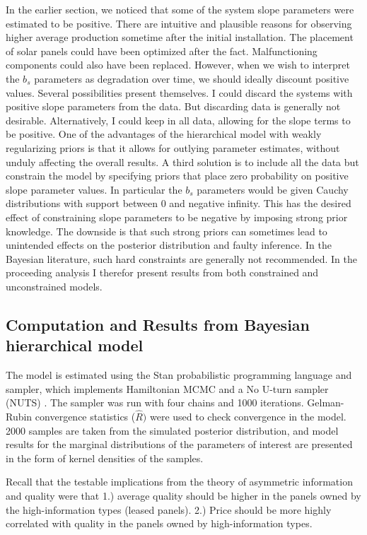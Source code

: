 \documentclass[a4paper]{article}
\begin{document}
In the earlier section, we noticed that some of the system slope parameters were estimated to be positive. There are intuitive and plausible reasons for observing higher average production sometime after the initial installation. The placement of solar panels could have been optimized after the fact. Malfunctioning components could also have been replaced. However, when we wish to interpret the $b_s$ parameters as degradation over time, we should ideally discount positive values. Several possibilities present themselves. I could discard the systems with positive slope parameters from the data. But discarding data is generally not desirable. Alternatively, I could keep in all data, allowing for the slope terms to be positive. One of the advantages of the hierarchical model with weakly regularizing priors is that it allows for outlying parameter estimates, without unduly affecting the overall results. A third solution is to include all the data but constrain the model by specifying priors that place zero probability on positive slope parameter values. In particular the $b_s$ parameters would be given Cauchy distributions with support between 0 and negative infinity. This has the desired effect of constraining slope parameters to be negative by imposing strong prior knowledge. The downside is that such strong priors can sometimes lead to unintended effects on the posterior distribution and faulty inference. In the Bayesian literature, such hard constraints are generally not recommended. In the proceeding analysis I therefor present results from both constrained and unconstrained models.

\subsection{Computation and Results from Bayesian hierarchical model}

The model is estimated using the Stan probabilistic programming language and sampler, which implements Hamiltonian MCMC and a No U-turn sampler (NUTS) \citep{stan_development_team_stan_2014}. The sampler was run with four chains and 1000 iterations. Gelman-Rubin convergence statistics ($\hat{R})$ were used to check convergence in the model. 2000 samples are taken from the simulated posterior distribution, and model results for the marginal distributions of the parameters of interest are presented in the form of kernel densities of the samples.

Recall that the testable implications from the theory of asymmetric information and quality were that 1.) average quality should be higher in the panels owned by the high-information types (leased panels). 2.) Price should be more highly correlated with quality in the panels owned by high-information types.
\end{document}
